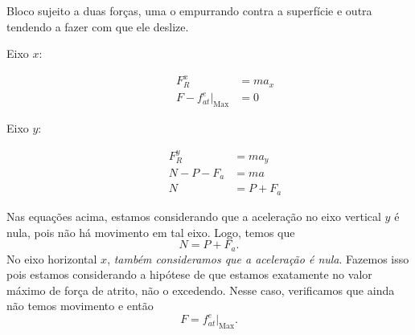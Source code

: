 \begin{marginfigure}
\centering
{}
\caption{Bloco sujeito a duas forças, uma o empurrando contra a superfície e outra tendendo a fazer com que ele deslize.\label{Fig:BlocoEmpurradoParaBaixo}}
\end{marginfigure}
\begin{description}
    \item[Eixo $x$:]
        \begin{align}
            F_R^x &= m a_x \\
            F - f_{at}^e|_{\textrm{Max}} &= 0
        \end{align}
    \item[Eixo $y$:]
        \begin{align}
            F_R^y &= m a_y \\
            N - P - F_a &= ma \\
            N &= P + F_a
        \end{align}
\end{description}

\noindent{}Nas equações acima, estamos considerando que a aceleração no eixo vertical $y$ é nula, pois não há movimento em tal eixo. Logo, temos que
\begin{equation}
    N = P + F_a.
\end{equation}
%
No eixo horizontal $x$, \emph{também consideramos que a aceleração é nula}. Fazemos isso pois estamos considerando a hipótese de que estamos exatamente no valor máximo de força de atrito, não o excedendo. Nesse caso, verificamos que ainda não temos movimento e então
\begin{equation}
    F = f_{at}^e|_{\textrm{Max}}.
\end{equation}

